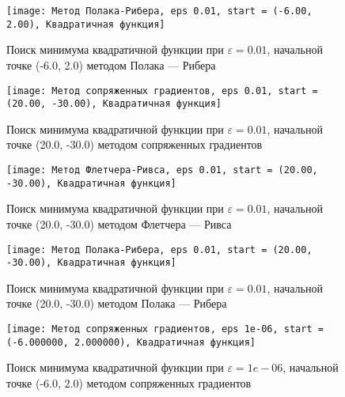             \begin{figure}[H]
	        \centering
	        \texttt{[image: Метод Полака-Рибера, eps 0.01, start = (-6.00, 2.00), Квадратичная функция]}%
	        \caption{Поиск минимума квадратичной функции при $\varepsilon = 0.01$, начальной точке (-6.0, 2.0) методом Полака --- Рибера}
	        \vspace*{-1.2cm}
            \end{figure}
            
            \begin{figure}[H]
	        \centering
	        \texttt{[image: Метод сопряженных градиентов, eps 0.01, start = (20.00, -30.00), Квадратичная функция]}%
	        \caption{Поиск минимума квадратичной функции при $\varepsilon = 0.01$, начальной точке (20.0, -30.0) методом сопряженных градиентов}
	        \vspace*{-1.2cm}
            \end{figure}
            
            \begin{figure}[H]
	        \centering
	        \texttt{[image: Метод Флетчера-Ривса, eps 0.01, start = (20.00, -30.00), Квадратичная функция]}%
	        \caption{Поиск минимума квадратичной функции при $\varepsilon = 0.01$, начальной точке (20.0, -30.0) методом Флетчера --- Ривса}
	        \vspace*{-1.2cm}
            \end{figure}
            
            \begin{figure}[H]
	        \centering
	        \texttt{[image: Метод Полака-Рибера, eps 0.01, start = (20.00, -30.00), Квадратичная функция]}%
	        \caption{Поиск минимума квадратичной функции при $\varepsilon = 0.01$, начальной точке (20.0, -30.0) методом Полака --- Рибера}
	        \vspace*{-1.2cm}
            \end{figure}
            
            \begin{figure}[H]
	        \centering
	        \texttt{[image: Метод сопряженных градиентов, eps 1e-06, start = (-6.000000, 2.000000), Квадратичная функция]}%
	        \caption{Поиск минимума квадратичной функции при $\varepsilon = 1e-06$, начальной точке (-6.0, 2.0) методом сопряженных градиентов}
	        \vspace*{-1.2cm}
            \end{figure}
            
